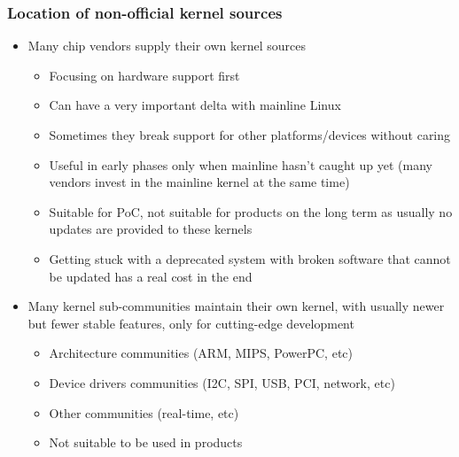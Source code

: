 \begin{frame}
  \frametitle{Location of non-official kernel sources}
  \begin{itemize}
  \item Many chip vendors supply their own kernel sources
    \begin{itemize}
    \item Focusing on hardware support first
    \item Can have a very important delta with mainline Linux
    \item Sometimes they break support for other platforms/devices
      without caring
    \item Useful in early phases only when mainline hasn't caught up yet
      (many vendors invest in the mainline kernel at the same time)
    \item Suitable for PoC, not suitable for products on the long term
      as usually no updates are provided to these kernels
    \item Getting stuck with a deprecated system with broken software
      that cannot be updated has a real cost in the end
    \end{itemize}
  \item Many kernel sub-communities maintain their own kernel, with
    usually newer but fewer stable features, only for cutting-edge
    development
    \begin{itemize}
    \item Architecture communities (ARM, MIPS, PowerPC, etc)
    \item Device drivers communities (I2C, SPI, USB, PCI, network, etc)
    \item Other communities (real-time, etc)
    \item Not suitable to be used in products
    \end{itemize}
  \end{itemize}
\end{frame}


